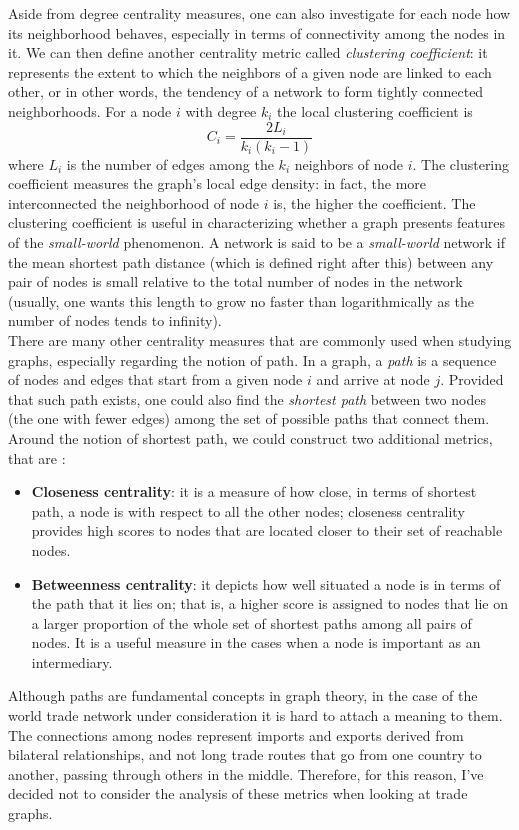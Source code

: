 Aside from degree centrality measures, one can also investigate for each node how its neighborhood behaves, especially in terms of connectivity among the nodes in it. We can then define another centrality metric called \textit{clustering coefficient}: it represents the extent to which the neighbors of a given node are linked to each other, or in other words, the tendency of a network to form tightly connected neighborhoods. For a node $i$ with degree $k_i$ the local clustering coefficient is
\[
    C_i = \frac{2 L_i}{k_i(k_i-1)}
\]
where $L_i$ is the number of edges among the $k_i$ neighbors of node $i$. The clustering coefficient measures the graph's local edge density: in fact, the more interconnected the neighborhood of node $i$ is, the higher the coefficient. The clustering coefficient is useful in characterizing whether a graph presents features of the \textit{small-world} phenomenon. A network is said to be a \textit{small-world} network if the mean shortest path distance (which is defined right after this) between any pair of nodes is small relative to the total number of nodes in the network (usually, one wants this length to grow no faster than logarithmically as the number of nodes tends to infinity).\\
There are many other centrality measures that are commonly used when studying graphs, especially regarding the notion of path. In a graph, a \textit{path} is a sequence of nodes and edges that start from a given node $i$ and arrive at node $j$. Provided that such path exists, one could also find the \textit{shortest path} between two nodes (the one with fewer edges) among the set of possible paths that connect them. Around the notion of shortest path, we could construct two additional metrics, that are \cite{benedictis2014bacicepii}:
\begin{itemize}
    \item \textbf{Closeness centrality}: it is a measure of how close, in terms of shortest path, a node is with respect to all the other nodes; closeness centrality provides high scores to nodes that are located closer to their set of reachable nodes.
    \item \textbf{Betweenness centrality}: it depicts how well situated a node is in terms of the path that it lies on; that is, a higher score is assigned to nodes that lie on a larger proportion of the whole set of shortest paths among all pairs of nodes. It is a useful measure in the cases when a node is important as an intermediary.
\end{itemize}
Although paths are fundamental concepts in graph theory, in the case of the world trade network under consideration it is hard to attach a meaning to them. The connections among nodes represent imports and exports derived from bilateral relationships, and not long trade routes that go from one country to another, passing through others in the middle. Therefore, for this reason, I've decided not to consider the analysis of these metrics when looking at trade graphs.


